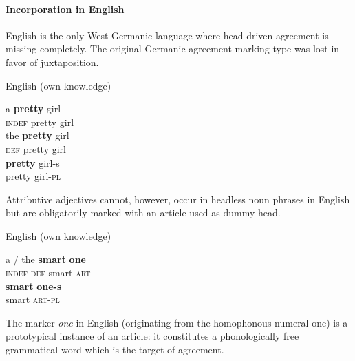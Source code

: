 \paragraph{Incorporation in English}
English is the only West Germanic language where head-driven agreement is missing completely. The original Germanic agreement marking type was lost in favor of juxtaposition. 
\begin{exe}
\ex \rm{English (own knowledge)}
\begin{xlist}
\ex 
\gll	a \textbf{pretty} girl\\
	\textsc{indef} pretty girl\\
\ex
\gll	the \textbf{pretty} girl\\
	\textsc{def} pretty girl\\
\ex 
\gll	\textbf{pretty} girl-s\\
	pretty girl-\textsc{pl}\\
\end{xlist}
\end{exe}
Attributive adjectives cannot, however, occur in headless noun phrases in English but are obligatorily marked with an article used as dummy head.
\begin{exe}
\ex \rm{English (own knowledge)}
\begin{xlist}
\ex
\gll	a / the \textbf{smart} \textbf{one}\\
	\textsc{indef} {} \textsc{def} smart \textsc{art}\\
\ex	
\gll	\textbf{smart} \textbf{one-s}\\
	smart \textsc{art}-\textsc{pl}\\
\end{xlist}
\end{exe}
The marker \textit{one} in English (originating from the homophonous numeral one) is a prototypical instance of an article: it constitutes a phonologically free grammatical word which is the target of agreement. 

